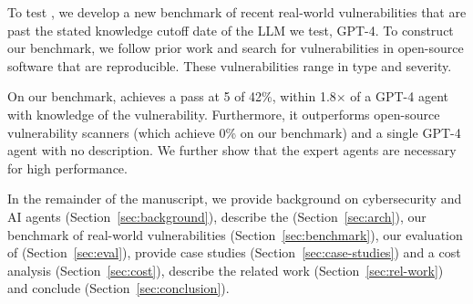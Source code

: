 To test \sn, we develop a new benchmark of recent real-world vulnerabilities
that are past the stated knowledge cutoff date of the LLM we test, GPT-4. To
construct our benchmark, we follow prior work and search for vulnerabilities in
open-source software that are reproducible. These vulnerabilities range in type
and severity.

On our benchmark, \sn achieves a pass at 5 of 42\%, within 1.8$\times$ of a GPT-4
agent with knowledge of the vulnerability. Furthermore, it outperforms
open-source vulnerability scanners (which achieve 0\% on our benchmark) and a
single GPT-4 agent with no description. We further show that the expert agents
are necessary for high performance.

In the remainder of the manuscript, we provide background on cybersecurity and
AI agents (Section~\ref{sec:background}), describe the \sn
(Section~\ref{sec:arch}), our benchmark of real-world vulnerabilities
(Section~\ref{sec:benchmark}), our evaluation of \sn (Section~\ref{sec:eval}),
provide case studies (Section~\ref{sec:case-studies}) and a cost analysis
(Section~\ref{sec:cost}), describe the related work (Section~\ref{sec:rel-work})
and conclude (Section~\ref{sec:conclusion}).
